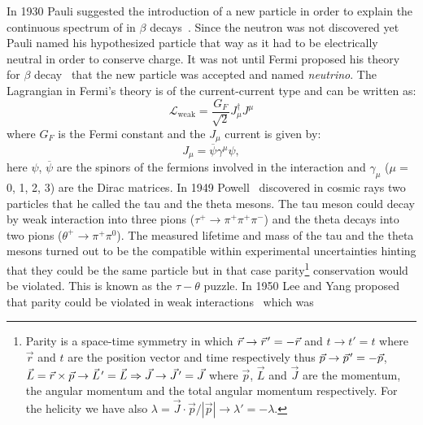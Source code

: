 In 1930 Pauli suggested the introduction of a new particle in order to explain
the continuous spectrum of in $\beta$ decays~\cite{PauliNeutrino}. Since the
neutron was not discovered yet Pauli named his hypothesized particle that way as
it had to be electrically neutral in order to conserve charge. It was not until
Fermi proposed his theory for $\beta$ decay~\cite{FermiTheory, FermiTheoryIta}
that the new particle was accepted and named \emph{neutrino}. The Lagrangian in
Fermi's theory is of the current-current type and can be written as:
\begin{equation}
  \mathcal{L}_\mathrm{weak} = \frac{G_F}{\sqrt{2}} J_\mu^\dagger
  J^\mu
  \label{eq:150}
\end{equation}
where $G_F$ is the Fermi constant and the $J_\mu$ current is given by:
\begin{equation}
  \label{eq:151}
  J_\mu = \overbar{\psi} \gamma^\mu \psi,
\end{equation}
here $\psi$, $\overbar{\psi}$ are the spinors of the fermions involved in the
interaction and $\gamma_\mu$ ($\mu =$ 0, 1, 2, 3) are the Dirac matrices. In
1949 Powell~\cite{PowellTauMeson} discovered in cosmic rays two particles that
he called the tau and the theta mesons. The tau meson could decay by weak
interaction into three pions ($\tau^+ \rightarrow \pi^+ \pi^+ \pi^-$) and the
theta decays into two pions ($\theta^+ \rightarrow \pi^+ \pi^0$). The measured
lifetime and mass of the tau and the theta mesons turned out to be the
compatible within experimental uncertainties hinting that they could be the same
particle but in that case parity\footnote{Parity is a space-time symmetry in
  which $\vec{r} \rightarrow \pvec{r}' = - \vec{r}$ and $t \rightarrow t' = t$
  where $\vec{r}$ and $t$ are the position vector and time respectively thus
  $\vec{p} \rightarrow \pvec{p}' = - \vec{p}$,
  $\vec{L} = \vec{r} \times \vec{p} \rightarrow \pvec{L}' = \vec{L} \Rightarrow
  \vec{J} \rightarrow \pvec{J}' = \vec{J}$ where $\vec{p}$, $\vec{L}$ and
  $\vec{J}$ are the momentum, the angular momentum and the total angular
  momentum respectively. For the helicity we have also
  $\lambda = \vec{J} \cdot \vec{p} / |\vec{p}| \rightarrow \lambda' = -
  \lambda$.} conservation would be violated. This is known as the
$\tau - \theta$ puzzle. In 1950 Lee and Yang proposed that parity could be
violated in weak interactions~\cite{LeeYangParityViolation} which was
